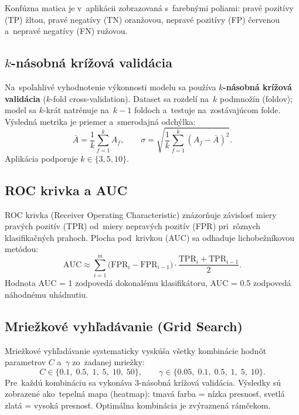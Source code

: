 \documentclass[12pt,a4paper]{article}
\begin{document}
Konfúzna matica je v~aplikácii zobrazovaná s~farebnými poliami:
pravé pozitívy (TP) žltou, pravé negatívy (TN) oranžovou,
nepravé pozitívy (FP) červenou a~nepravé negatívy (FN) ružovou.

\subsection{$k$-násobná krížová validácia}

Na~spoľahlivé vyhodnotenie výkonnosti modelu sa používa
\textbf{$k$-násobná krížová validácia} ($k$-fold cross-validation).
Dataset sa rozdelí na~$k$ podmnožín (foldov); model sa $k$-krát
natrénuje na~$k-1$ foldoch a~testuje na~zostávajúcom folde.
Výsledná metrika je priemer a~smerodajná odchýlka:
\begin{equation}
  \bar{A} = \frac{1}{k}\sum_{f=1}^{k} A_f,
  \qquad
  \sigma = \sqrt{\frac{1}{k}\sum_{f=1}^{k}(A_f - \bar{A})^2}.
\end{equation}
Aplikácia podporuje $k \in \{3, 5, 10\}$.

\subsection{ROC krivka a AUC}

ROC krivka (Receiver Operating Characteristic) znázorňuje závislosť
miery pravých pozitív (TPR) od~miery nepravých pozitív (FPR) pri~rôznych
klasifikačných prahoch. Plocha pod~krivkou (AUC) sa odhaduje
lichobežníkovou metódou:
\begin{equation}
  \mathrm{AUC} \approx \sum_{i=1}^{m}
  \bigl(\mathrm{FPR}_i - \mathrm{FPR}_{i-1}\bigr)
  \cdot \frac{\mathrm{TPR}_i + \mathrm{TPR}_{i-1}}{2}.
\end{equation}
Hodnota AUC = 1 zodpovedá dokonalému klasifikátoru, AUC = 0.5
zodpovedá náhodnému uhádnutiu.

\subsection{Mriežkové vyhľadávanie (Grid Search)}

Mriežkové vyhľadávanie systematicky vyskúša všetky kombinácie hodnôt
parametrov $C$ a~$\gamma$ zo~zadanej mriežky:
\begin{equation}
  C \in \{0.1,\; 0.5,\; 1,\; 5,\; 10,\; 50\},
  \qquad
  \gamma \in \{0.05,\; 0.1,\; 0.5,\; 1,\; 5,\; 10\}.
\end{equation}
Pre~každú kombináciu sa vykonáva 3-násobná krížová validácia. Výsledky
sú zobrazené ako~tepelná mapa (heatmap): tmavá farba = nízka presnosť,
svetlá zlatá = vysoká presnosť. Optimálna kombinácia je zvýraznená rámčekom.
\end{document}

